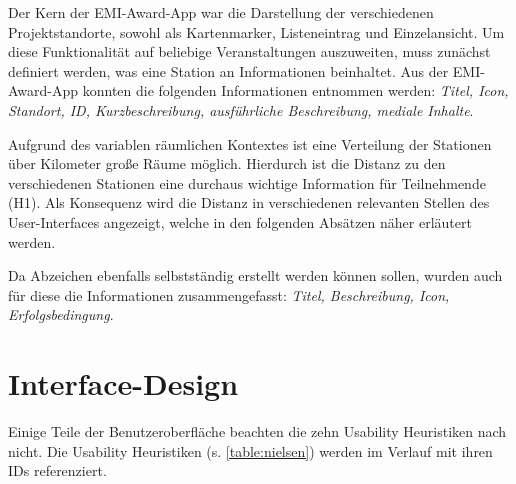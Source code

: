 
Der Kern der EMI-Award-App war die Darstellung der verschiedenen
Projektstandorte, sowohl als Kartenmarker, Listeneintrag und Einzelansicht. Um
diese Funktionalität auf beliebige Veranstaltungen auszuweiten, muss zunächst
definiert werden, was eine Station an Informationen beinhaltet. Aus der
EMI-Award-App konnten die folgenden Informationen entnommen werden:
\textit{Titel, Icon, Standort, ID, Kurzbeschreibung, ausführliche Beschreibung,
    mediale Inhalte}.

Aufgrund des variablen räumlichen Kontextes ist eine Verteilung der Stationen
über Kilometer große Räume möglich. Hierdurch ist die Distanz zu den
verschiedenen Stationen eine durchaus wichtige Information für Teilnehmende
(H1). Als Konsequenz wird die Distanz in verschiedenen relevanten Stellen des
User-Interfaces angezeigt, welche in den folgenden Absätzen näher erläutert
werden.


Da Abzeichen ebenfalls selbstständig erstellt werden können
sollen, wurden auch für diese die Informationen zusammengefasst: \textit{Titel,
    Beschreibung, Icon, Erfolgsbedingung}.

\section{Interface-Design}


Einige Teile der Benutzeroberfläche beachten die zehn Usability Heuristiken
nach \textcite{Nielsen1994} nicht. Die Usability Heuristiken (s.
\autoref{table:nielsen}) werden im Verlauf mit ihren IDs referenziert.

